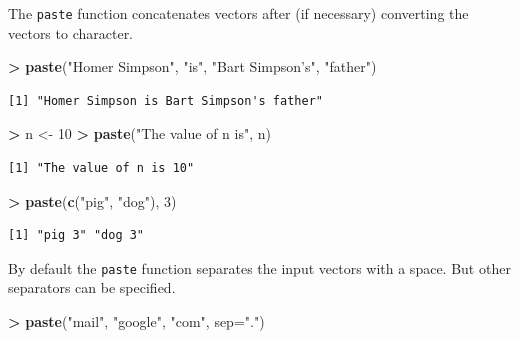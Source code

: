 \documentclass[]{krantz}
\makeatletter
\newenvironment{Shaded}{\begin{snugshade}}{\end{snugshade}}
\newcommand{\KeywordTok}[1]{\textcolor[rgb]{0.27,0.27,0.27}{\textbf{#1}}}
\newcommand{\DataTypeTok}[1]{\textcolor[rgb]{0.27,0.27,0.27}{#1}}
\newcommand{\DecValTok}[1]{\textcolor[rgb]{0.06,0.06,0.06}{#1}}
\newcommand{\StringTok}[1]{\textcolor[rgb]{0.5,0.5,0.5}{#1}}
\newcommand{\OperatorTok}[1]{\textcolor[rgb]{0.43,0.43,0.43}{\textbf{#1}}}
\newcommand{\NormalTok}[1]{#1}
\newenvironment{kframe}{%
\medskip{}
\setlength{\fboxsep}{.8em}
 \def\at@end@of@kframe{}%
 \ifinner\ifhmode%
  \def\at@end@of@kframe{\end{minipage}}%
  \begin{minipage}{\columnwidth}%
 \fi\fi%
 \def\FrameCommand##1{\hskip\@totalleftmargin \hskip-\fboxsep
 \colorbox{shadecolor}{##1}\hskip-\fboxsep
     \hskip-\linewidth \hskip-\@totalleftmargin \hskip\columnwidth}%
 \MakeFramed {\advance\hsize-\width
   \@totalleftmargin\z@ \linewidth\hsize
   \@setminipage}}%
 {\par\unskip\endMakeFramed%
 \at@end@of@kframe}
\renewenvironment{Shaded}{\begin{kframe}}{\end{kframe}}
\makeatother
\begin{document}
The \texttt{paste} function concatenates vectors after (if necessary)
converting the vectors to character.

\begin{Shaded}
\begin{Highlighting}[]
\OperatorTok{>}\StringTok{ }\KeywordTok{paste}\NormalTok{(}\StringTok{"Homer Simpson"}\NormalTok{, }\StringTok{"is"}\NormalTok{, }\StringTok{"Bart Simpson's"}\NormalTok{, }\StringTok{"father"}\NormalTok{)}
\end{Highlighting}
\end{Shaded}

\begin{verbatim}
[1] "Homer Simpson is Bart Simpson's father"
\end{verbatim}

\begin{Shaded}
\begin{Highlighting}[]
\OperatorTok{>}\StringTok{ }\NormalTok{n <-}\StringTok{ }\DecValTok{10}
\OperatorTok{>}\StringTok{ }\KeywordTok{paste}\NormalTok{(}\StringTok{"The value of n is"}\NormalTok{, n)}
\end{Highlighting}
\end{Shaded}

\begin{verbatim}
[1] "The value of n is 10"
\end{verbatim}

\begin{Shaded}
\begin{Highlighting}[]
\OperatorTok{>}\StringTok{ }\KeywordTok{paste}\NormalTok{(}\KeywordTok{c}\NormalTok{(}\StringTok{"pig"}\NormalTok{, }\StringTok{"dog"}\NormalTok{), }\DecValTok{3}\NormalTok{)}
\end{Highlighting}
\end{Shaded}

\begin{verbatim}
[1] "pig 3" "dog 3"
\end{verbatim}

By default the \texttt{paste} function separates the input vectors with
a space. But other separators can be specified.

\begin{Shaded}
\begin{Highlighting}[]
\OperatorTok{>}\StringTok{ }\KeywordTok{paste}\NormalTok{(}\StringTok{"mail"}\NormalTok{, }\StringTok{"google"}\NormalTok{, }\StringTok{"com"}\NormalTok{, }\DataTypeTok{sep=}\StringTok{"."}\NormalTok{)}
\end{Highlighting}
\end{Shaded}
\end{document}

